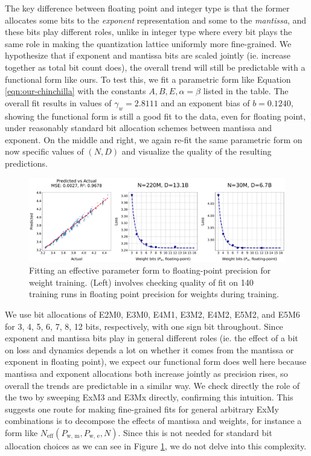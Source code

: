 \documentclass[11pt]{article}
\begin{document}
The key difference between floating point and integer type is that the former allocates some bits to the \textit{exponent} representation and some to the \textit{mantissa}, and these bits play different roles, unlike in integer type where every bit plays the same role in making the quantization lattice uniformly more fine-grained. We hypothesize that if exponent and mantissa bits are scaled jointly (ie. increase together as total bit count does), the overall trend will still be predictable with a functional form like ours. To test this, we fit a parametric form like Equation \ref{eqn:our-chinchilla} with the constants $A, B, E, \alpha = \beta$ listed in the table. The overall fit results in values of $\gamma_w = 2.8111$ and an exponent bias of $b = 0.1240$, showing the functional form is still a good fit to the data, even for floating point, under reasonably standard bit allocation schemes between mantissa and exponent. On the middle and right, we again re-fit the same parametric form on now specific values of $(N, D)$ and visualize the quality of the resulting predictions. 
\begin{figure}
    \centering
    \includegraphics[width=\linewidth]{fp_sweep_fit.pdf}
    \caption{{Fitting an effective parameter form to floating-point precision for weight training. (Left) involves checking quality of fit on 140 training runs in floating point precision for weights during training.}}
    \label{fig:fp-fit}
\end{figure}

We use bit allocations of E2M0, E3M0, E4M1, E3M2, E4M2, E5M2, and E5M6 for 3, 4, 5, 6, 7, 8, 12 bits, respectively, with one sign bit throughout. Since exponent and mantissa bits play in general different roles (ie. the effect of a bit on loss and dynamics depends a lot on whether it comes from the mantissa or exponent in floating point), we expect our functional form does well here because mantissa and exponent allocations both increase jointly as precision rises, so overall the trends are predictable in a similar way. We check directly the role of the two by sweeping ExM3 and E3Mx directly, confirming this intuition. This suggests one route for making fine-grained fits for general arbitrary ExMy combinations is to decompose the effects of mantissa and weights, for instance a form like $N_\text{eff}(P_\text{w, m}, P_\text{w, e}, N)$. Since this is not needed for standard bit allocation choices as we can see in Figure \ref{fig:fp-fit}, we do not delve into this complexity. 
\end{document}
